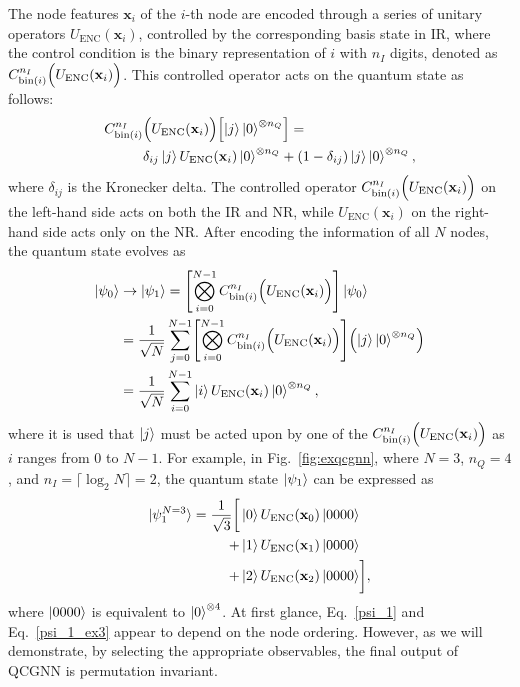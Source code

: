 \documentclass[reprint,amsmath,amssymb,prd,nofootinbib]{revtex4-2}
\def\xbf{\mathbf{x}}
\def\UENC{U_{\text{ENC}}}
\begin{document}
The node features $\xbf_i$ of the $i$-th node are encoded through a series of unitary operators $\UENC(\xbf_i)$, controlled by the corresponding basis state in IR, where the control condition is the binary representation of $i$ with $n_I$ digits, denoted as $C^{n_I}_{\text{bin}(i)} \Bigl( \UENC(\xbf_i) \Bigr)$. This controlled operator acts on the quantum state as follows:
\begin{equation} \label{mc_gates}
    \begin{split}
        C^{n_I}_{\text{bin}(i)} & \Bigl( \UENC(\xbf_i) \Bigr) \Bigl[ \ket{j}\ket{0}^{\otimes n_Q} \Bigr] = \\
        &\delta_{ij}\ket{j}\UENC(\xbf_i)\ket{0}^{\otimes n_Q} + (1-\delta_{ij})\ket{j}\ket{0}^{\otimes n_Q},
    \end{split}
\end{equation}
where $\delta_{ij}$ is the Kronecker delta. The controlled operator $C^{n_I}_{\text{bin}(i)} \Bigl( \UENC(\xbf_i) \Bigr)$ on the left-hand side acts on both the IR and NR, while $\UENC(\xbf_i)$ on the right-hand side acts only on the NR. After encoding the information of all $N$ nodes, the quantum state evolves as
\begin{equation} \label{psi_1}
    \begin{split}
        \ket{\psi_0} &\rightarrow
        \ket{\psi_1} = \Biggl[\bigotimes^{N-1}_{i=0}C^{n_I}_{\text{bin}(i)} \Bigl( \UENC(\xbf_i) \Bigr)\Biggr]\ket{\psi_0} \\
        &= \frac{1}{\sqrt{N}}\sum^{N-1}_{j=0}\Biggl[\bigotimes^{N-1}_{i=0}C^{n_I}_{\text{bin}(i)} \Bigl( \UENC(\xbf_i) \Bigr)\Biggr] \Bigl( \ket{j}\ket{0}^{\otimes n_Q} \Bigr) \\
        &= \frac{1}{\sqrt{N}}\sum^{N-1}_{i=0}\ket{i}\UENC(\xbf_i)\ket{0}^{\otimes n_Q}, \\
    \end{split}
\end{equation}
where it is used that $\ket{j}$ must be acted upon by one of the $C^{n_I}_{\text{bin}(i)} \Bigl( \UENC(\xbf_i) \Bigr)$ as $i$ ranges from $0$ to $N-1$. For example, in Fig.~\ref{fig:exqcgnn}, where $N=3$, $n_Q=4$, and $n_I=\lceil \log_2 N \rceil=2$, the quantum state $\ket{\psi_1}$ can be expressed as
\begin{equation} \label{psi_1_ex3}
    \begin{split}
        \ket{\psi^{N=3}_1} = \frac{1}{\sqrt{3}} \biggr[ &\ket{0}\UENC(\xbf_0)\ket{0000} \\
        + &\ket{1}\UENC(\xbf_1)\ket{0000}\\
        + &\ket{2}\UENC(\xbf_2)\ket{0000} \biggr] ,
    \end{split}
\end{equation}
where $\ket{0000}$ is equivalent to $\ket{0}^{\otimes 4}$. At first glance, Eq.~\ref{psi_1} and Eq.~\ref{psi_1_ex3} appear to depend on the node ordering. However, as we will demonstrate, by selecting the appropriate observables, the final output of QCGNN is permutation invariant.
\end{document}
